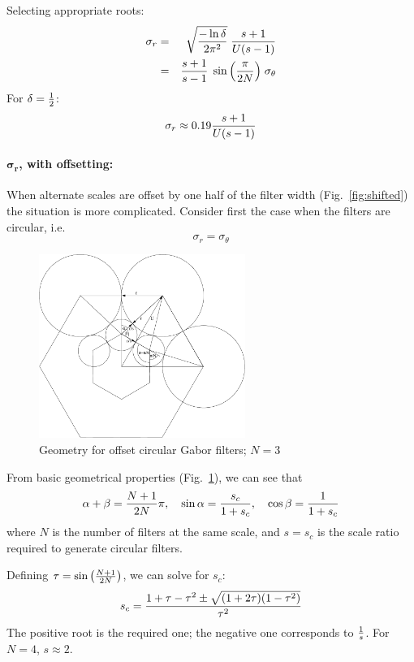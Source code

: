 \documentclass[12pt,a4]{article}
\begin{document}
Selecting appropriate roots:
\begin{eqnarray}
   \sigma_r &=& \sqrt{-\ln{\delta}\over 2\pi^2} \;{s+1\over U(s-1)} \label{eq:sigma_r}\\
   &=& {s+1\over s-1}\; \sin{\left(\pi\over2N\right)}\; \sigma_\theta \nonumber
\end{eqnarray}
For $\delta={1\over2}$:
\[ \sigma_r \approx 0.19 {s+1\over U(s-1)} \]
 
\paragraph{$\mathbf{\sigma_r}$, with offsetting:}
When alternate scales are offset by one half of the filter width (Fig.~\ref{fig:shifted}) the situation is more complicated.  Consider first the case when the filters are circular, i.e.\ 
\begin{equation}
  \label{eq:circ}
  \sigma_r = \sigma_\theta
\end{equation}

\begin{figure}
  \centering
  \includegraphics[width=0.6\textwidth]{circles}
  \caption{Geometry for offset circular Gabor filters; $N = 3$}
  \label{fig:circles}
\end{figure}
From basic geometrical properties (Fig.~\ref{fig:circles}), we can see that 
\[ \alpha + \beta = {N+1\over 2N}\pi, \quad \sin\alpha = {s_c\over 1+s_c}, \quad \cos\beta = {1\over 1+s_c} \]
where $N$ is the number of filters at the same scale, and $s=s_c$ is the scale ratio required to generate circular filters.

Defining $\tau = \sin\left({N+1\over 2N}\right)$, we can solve for $s_c$:
\[ s_c = {1+\tau-\tau^2 \pm \sqrt{(1+2\tau)(1-\tau^2)}\over \tau^2} \]
The positive root is the required one; the negative one corresponds to $1\over s$. For $N=4$, $s \approx 2$.
\end{document}
